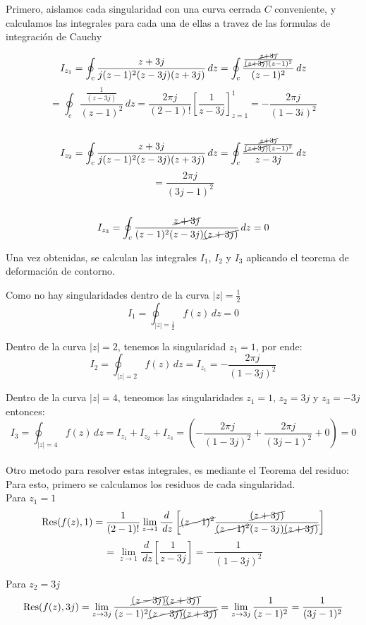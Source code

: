 \documentclass[12pt,a4paper]{report}
\begin{document}
\vspace{1cm}

Primero, aislamos cada singularidad con una curva cerrada $C$ conveniente, y calculamos las integrales para cada una de ellas a travez de las formulas de integración 
de Cauchy\\
\begin{samepage}
$$I_{z_1} = \oint_{c}\frac{z+3j}{j(z - 1)^2(z-3j)(z+3j)} \, dz =\oint_{c}\frac{\frac{\cancel{z+3j}}{\cancel{(z+3j)}(z-1)^2}}{(z-1)^2} \, dz$$
$$= \oint_{c}\frac{\frac{1}{(z-3j)}}{(z-1)^2} \, dz = \frac{2\pi j}{(2-1)!} \left[ \frac{1}{z-3j} \right]_{z=1}^1= -\frac{2\pi j}{(1-3i)^2}$$\\
$$I_{z_2} = \oint_{c}\frac{z+3j}{j(z - 1)^2(z-3j)(z+3j)} \, dz =\oint_{c}\frac{\frac{\cancel{z+3j}}{\cancel{(z+3j)}(z-1)^2}}{z-3j} \, dz $$
$$=\frac{2\pi j}{(3j-1)^2}$$\\
$$I_{z_3} = \oint_{c}\frac{\cancel{z+3j}}{(z - 1)^2(z-3j)\cancel{(z+3j)}} \, dz=0$$
\end{samepage}

Una vez obtenidas, se calculan las integrales $I_1$, $I_2$ y $I_3$ aplicando el teorema de deformación de contorno.

Como no hay singularidades dentro de la curva $|z|=\frac{1}{2}$
$$I_1=\oint_{|z|=\frac{1}{2}}f(z) \, dz= 0$$

Dentro de la curva $|z|=2$, tenemos la singularidad $z_1=1$, por ende:
$$I_2=\oint_{|z|=2}f(z) \, dz = I_{z_1} = - \frac{2 \pi j}{(1-3j)^2}$$

Dentro de la curva $|z|=4$, teneomos las singularidades $z_1=1$, $z_2=3j$ y $z_3=-3j$ entonces:
$$I_3=\oint_{|z|=4}f(z) \, dz = I_{z_1}+I_{z_2}+I_{z_3} =( -\frac{2 \pi j }{(1-3j)^2} + \frac{2 \pi j}{(3j-1)^2} + 0) = 0$$\\

Otro metodo para resolver estas integrales, es mediante el Teorema del residuo:\\

Para esto, primero se calculamos los residuos de cada singularidad.\\

Para $z_1=1$
$$\text{Res}(f(z),1)=\frac{1}{(2-1)!} \lim_{z \to 1} \frac{d}{\,dz} \left[ \cancel{(z-1)^2} \frac{\cancel{(z+3j)}}{\cancel{(z-1)^2}(z-3j) \cancel{(z+3j)}} \right]$$
$$= \lim_{z \to 1} \frac{d}{\,dz} \left[ \frac{1}{z-3j} \right]=-\frac{1}{(1-3j)^2}$$

Para $z_2=3j$
$$\text{Res}(f(z),3j)= \lim_{z \to 3j} \frac{\cancel{(z-3j)}\cancel{(z+3j)}}{(z-1)^2\cancel{(z-3j)}\cancel{(z+3j)}}= \lim_{z \to 3j} \frac{1}{(z-1)^2}=\frac{1}{(3j-1)^2}$$
\end{document}
